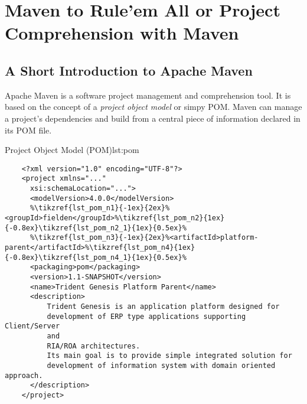 \chapter{Maven to Rule'em All or Project Comprehension with Maven}\label{ch00:01}

\section{A Short Introduction to Apache Maven}
  
  Apache Maven is a software project management and comprehension tool. 
  It is based on the concept of a \emph{project object model} or simpy POM. 
  Maven can manage a project's dependencies and build from a central piece of information declared in its POM file.

  \begin{code}{Project Object Model (POM)}{lst:pom}
    \begin{lstlisting}
    <?xml version="1.0" encoding="UTF-8"?>
    <project xmlns="..."
	  xsi:schemaLocation="...">
	  <modelVersion>4.0.0</modelVersion>
	  %\tikzref{lst_pom_n1}{-1ex}{2ex}%<groupId>fielden</groupId>%\tikzref{lst_pom_n2}{1ex}{-0.8ex}\tikzref{lst_pom_n2_1}{1ex}{0.5ex}%
	  %\tikzref{lst_pom_n3}{-1ex}{2ex}%<artifactId>platform-parent</artifactId>%\tikzref{lst_pom_n4}{1ex}{-0.8ex}\tikzref{lst_pom_n4_1}{1ex}{0.5ex}%
	  <packaging>pom</packaging>
	  <version>1.1-SNAPSHOT</version>
	  <name>Trident Genesis Platform Parent</name>
	  <description>
		  Trident Genesis is an application platform designed for
		  development of ERP type applications supporting Client/Server
		  and
		  RIA/ROA architectures.
		  Its main goal is to provide simple integrated solution for 
		  development of information system with domain oriented approach. 
	  </description>
    </project> 
    \end{lstlisting}
  \end{code}


